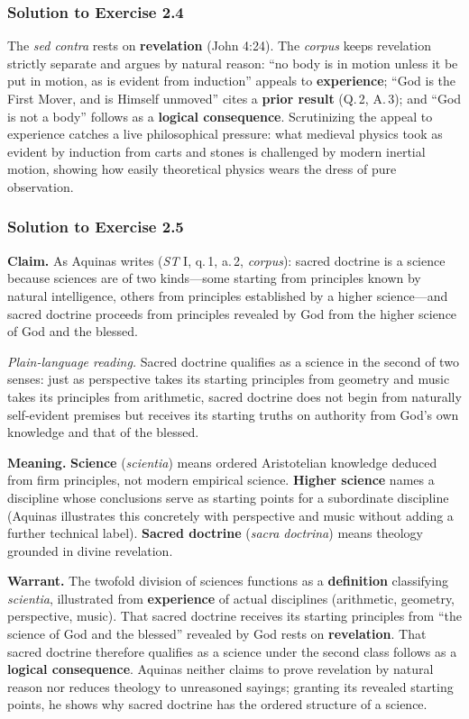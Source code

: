 \subsubsection*{Solution to Exercise 2.4}
The \emph{sed contra} rests on \textbf{revelation} (John 4:24). The \emph{corpus} keeps revelation strictly separate and argues by natural reason: ``no body is in motion unless it be put in motion, as is evident from induction'' appeals to \textbf{experience}; ``God is the First Mover, and is Himself unmoved'' cites a \textbf{prior result} (Q.\,2, A.\,3); and ``God is not a body'' follows as a \textbf{logical consequence}. Scrutinizing the appeal to experience catches a live philosophical pressure: what medieval physics took as evident by induction from carts and stones is challenged by modern inertial motion, showing how easily theoretical physics wears the dress of pure observation.

\subsubsection*{Solution to Exercise 2.5}
\textbf{Claim.} As Aquinas writes (\emph{ST} I, q.\,1, a.\,2, \emph{corpus}): sacred doctrine is a science because sciences are of two kinds---some starting from principles known by natural intelligence, others from principles established by a higher science---and sacred doctrine proceeds from principles revealed by God from the higher science of God and the blessed.

\emph{Plain-language reading.} Sacred doctrine qualifies as a science in the second of two senses: just as perspective takes its starting principles from geometry and music takes its principles from arithmetic, sacred doctrine does not begin from naturally self-evident premises but receives its starting truths on authority from God's own knowledge and that of the blessed.

\textbf{Meaning.} \textbf{Science} (\emph{scientia}) means ordered Aristotelian knowledge deduced from firm principles, not modern empirical science. \textbf{Higher science} names a discipline whose conclusions serve as starting points for a subordinate discipline (Aquinas illustrates this concretely with perspective and music without adding a further technical label). \textbf{Sacred doctrine} (\emph{sacra doctrina}) means theology grounded in divine revelation.

\textbf{Warrant.} The twofold division of sciences functions as a \textbf{definition} classifying \emph{scientia}, illustrated from \textbf{experience} of actual disciplines (arithmetic, geometry, perspective, music). That sacred doctrine receives its starting principles from ``the science of God and the blessed'' revealed by God rests on \textbf{revelation}. That sacred doctrine therefore qualifies as a science under the second class follows as a \textbf{logical consequence}. Aquinas neither claims to prove revelation by natural reason nor reduces theology to unreasoned sayings; granting its revealed starting points, he shows why sacred doctrine has the ordered structure of a science.
